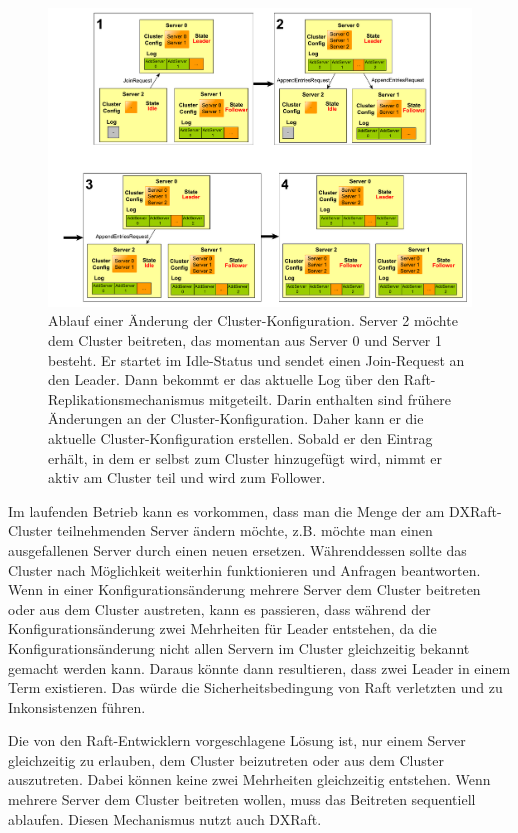 \begin{figure}[p]
	\centering
	\includegraphics[width=\linewidth]{img/config-change}
	\caption{Ablauf einer Änderung der Cluster-Konfiguration. Server 2 möchte dem Cluster beitreten, das momentan aus Server 0 und Server 1 besteht. Er startet im Idle-Status und sendet einen Join-Request an den Leader. Dann bekommt er das aktuelle Log über den Raft-Replikationsmechanismus mitgeteilt. Darin enthalten sind frühere Änderungen an der Cluster-Konfiguration. Daher kann er die aktuelle Cluster-Konfiguration erstellen. Sobald er den Eintrag erhält, in dem er selbst zum Cluster hinzugefügt wird, nimmt er aktiv am Cluster teil und wird zum Follower.}
	\label{fig:config-change}
\end{figure}

Im laufenden Betrieb kann es vorkommen, dass man die Menge der am DXRaft-Cluster teilnehmenden Server ändern möchte, z.B. möchte man einen ausgefallenen Server durch einen neuen ersetzen. Währenddessen sollte das Cluster nach Möglichkeit weiterhin funktionieren und Anfragen beantworten. Wenn in einer Konfigurationsänderung mehrere Server dem Cluster beitreten oder aus dem Cluster austreten, kann es passieren, dass während der Konfigurationsänderung zwei Mehrheiten für Leader entstehen, da die Konfigurationsänderung nicht allen Servern im Cluster gleichzeitig bekannt gemacht werden kann. Daraus könnte dann resultieren, dass zwei Leader in einem Term existieren. Das würde die Sicherheitsbedingung von Raft verletzten und zu Inkonsistenzen führen.

Die von den Raft-Entwicklern vorgeschlagene Lösung ist, nur einem Server gleichzeitig zu erlauben, dem Cluster beizutreten oder aus dem Cluster auszutreten. Dabei können keine zwei Mehrheiten gleichzeitig entstehen. Wenn mehrere Server dem Cluster beitreten wollen, muss das Beitreten sequentiell ablaufen. Diesen Mechanismus nutzt auch DXRaft.

